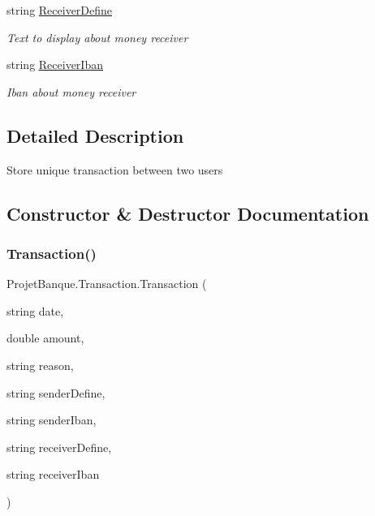 \begin{DoxyCompactItemize}
string \mbox{\hyperlink{class_projet_banque_1_1_transaction_a868dda33ec8d27091ba8f68a64464e29}{Receiver\+Define}}
\begin{DoxyCompactList}\small\item\em Text to display about money receiver \end{DoxyCompactList}\item 
string \mbox{\hyperlink{class_projet_banque_1_1_transaction_aae1fe1c44f9b294bf92f549930a9218b}{Receiver\+Iban}}
\begin{DoxyCompactList}\small\item\em Iban about money receiver \end{DoxyCompactList}\end{DoxyCompactItemize}


\subsection{Detailed Description}
Store unique transaction between two users 



\subsection{Constructor \& Destructor Documentation}
\mbox{\label{class_projet_banque_1_1_transaction_a8e5d39a1547162d6dcdf59aa5a65a2bf}} 
\subsubsection{\texorpdfstring{Transaction()}{Transaction()}}
{\footnotesize\ttfamily Projet\+Banque.\+Transaction.\+Transaction (\begin{DoxyParamCaption}\item[{string}]{date,  }\item[{double}]{amount,  }\item[{string}]{reason,  }\item[{string}]{sender\+Define,  }\item[{string}]{sender\+Iban,  }\item[{string}]{receiver\+Define,  }\item[{string}]{receiver\+Iban }\end{DoxyParamCaption})}




